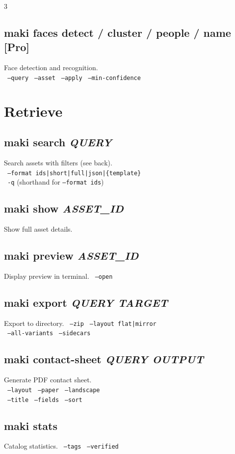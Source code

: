 \documentclass[a4paper,landscape,8pt]{article}
\newcommand{\cmd}[1]{\texttt{\footnotesize #1}}
\newcommand{\opt}[1]{\texttt{\scriptsize\color{maki-stone} #1}}
\newcommand{\pro}{\textcolor{maki-teal}{\scriptsize [Pro]}}
\begin{document}
\begin{multicols}{3}
\subsection{maki faces detect / cluster / people / name \pro}
Face detection and recognition. \\
\opt{--query} \opt{--asset} \opt{--apply} \opt{--min-confidence}

\section{Retrieve}

\subsection{maki search \textit{QUERY}}
Search assets with filters (see back). \\
\opt{--format ids|short|full|json|\{template\}} \\
\opt{-q} (shorthand for \cmd{--format ids})

\subsection{maki show \textit{ASSET\_ID}}
Show full asset details.

\subsection{maki preview \textit{ASSET\_ID}}
Display preview in terminal. \opt{--open}

\subsection{maki export \textit{QUERY TARGET}}
Export to directory. \opt{--zip} \opt{--layout flat|mirror} \\
\opt{--all-variants} \opt{--sidecars}

\subsection{maki contact-sheet \textit{QUERY OUTPUT}}
Generate PDF contact sheet. \\
\opt{--layout} \opt{--paper} \opt{--landscape} \\
\opt{--title} \opt{--fields} \opt{--sort}

\subsection{maki stats}
Catalog statistics. \opt{--tags} \opt{--verified}


\end{multicols}
\end{document}
